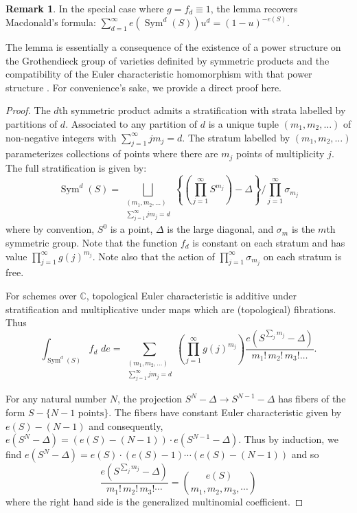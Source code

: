 \documentclass{amsart}
\theoremstyle{definition}
\newtheorem{remark}[theorem]{Remark}
\newcommand{\CC} {\mathbb{C}}          %
\newcommand{\Sym}{\operatorname{Sym}}
\begin{document}
\begin{remark}
In the special case where $g=f_{d}\equiv  1$, the lemma recovers
Macdonald's formula: $\sum _{d=1}^{\infty }e (\Sym ^{d} (S)) u^{d} =
(1-u)^{-e (S)}$. 

The lemma is essentially a consequence of the existence of a power
structure on the Grothendieck group of varieties definited by
symmetric products and the compatibility of the Euler characteristic
homomorphism with that power structure \cite{}. For convenience's
sake, we provide a direct proof here.
\end{remark}
\begin{proof}
The $d$th symmetric product admits a stratification with strata
labelled by partitions of $d$. Associated to any partition of $d$ is a
unique tuple $(m_{1},m_{2},\dots )$ of non-negative integers with
$\sum _{j=1}^{\infty }j m_{j}=d$. The stratum labelled by
$(m_{1},m_{2},\dots )$ parameterizes collections of points where there
are $m_{j}$ points of multiplicity $j$. The full stratification is
given by:
\[
\Sym ^{d} (S) = \bigsqcup_{\begin{smallmatrix} (m_{1},m_{2},\dots )\\
\sum _{j=1}^{\infty }j m_{j}=d  \end{smallmatrix}} \left\{\left(\prod _{j=1}^{\infty }S^{m_{j}} \right) -\Delta  \right\}/ \prod _{j=1}^{\infty }\sigma _{m_{j}} 
\]
where by convention, $S^{0}$ is a point, $\Delta $ is the large
diagonal, and $\sigma _{m}$ is the $m$th symmetric group. Note that
the function $f_{d}$ is constant on each stratum and has value $\prod
_{j=1}^{\infty }g (j)^{m_{j}}$. Note also that the action of $\prod
_{j=1}^{\infty }\sigma _{m_{j}}$ on each stratum is free. 

For schemes over $\CC $, topological Euler characteristic is additive
under stratification and multiplicative under maps which are
(topological) fibrations. Thus
\[
\int _{\Sym ^{d} (S)} f_{d}\,\, de = \sum _{\begin{smallmatrix}(m_{1},m_{2},\dots )\\
\sum _{j=1}^{\infty }j m_{j}=d   \end{smallmatrix}} \left(\prod _{j=1}^{\infty } g (j)^{m_{j}} \right) \frac{e (S^{\sum _{j}m_{j}}-\Delta )}{m_{1}!\, m_{2}!\, m_{3}!\dots }.
\]

For any natural number $N$, the projection $S^{N}-\Delta \to
S^{N-1}-\Delta $ has fibers of the form $S-\{N-1\text{ points}
\}$. The fibers have constant Euler characteristic given by $e (S)-
(N-1)$ and consequently, $e (S^{N}-\Delta )= (e (S)- (N-1))\cdot e
(S^{N-1}-\Delta )$. Thus by induction, we find $e (S^{N}-\Delta ) = e
(S)\cdot (e (S)-1)\cdots (e (S)- (N-1))$ and so 
\[
\frac{e (S^{\sum _{j}m_{j}}-\Delta )}{m_{1}!\,m_{2}!\,m_{3}!\cdots } = \binom{e (S)}{m_{1},m_{2},m_{3},\cdots }
\]
where the right hand side is the generalized multinomial coefficient.


\end{proof}
\end{document}
